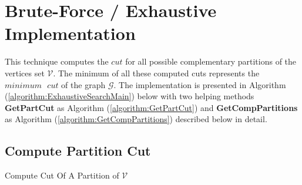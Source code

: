 \documentclass[longpaper, english, final, times]{revdetua}
\begin{document}
	\section{\label{outline:project-structure}}
	 	
	\section{\label{outline:exhaustive} Brute-Force / Exhaustive Implementation}
		This technique computes the $cut$ for all possible complementary partitions of the vertices set $\mathcal{V}$. The minimum of all these computed cuts represents the $minimum \text{ } cut$ of the graph $\mathcal{G}$. The implementation is presented in Algorithm (\ref{algorithm:ExhaustiveSearchMain}) below with two helping methods \textbf{GetPartCut} as Algorithm (\ref{algorithm:GetPartCut}) and \textbf{GetCompPartitions} as Algorithm (\ref{algorithm:GetCompPartitions}) described below in detail.
		
			\subsection{Compute Partition Cut}
				\begin{algorithm}
					\caption{Compute Cut Of A Partition of $\mathcal{V}$}
					\label{algorithm:GetPartCut}
					
					\DontPrintSemicolon
					
					
					
				\end{algorithm}
				
\end{document}
